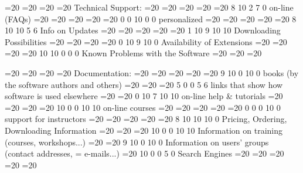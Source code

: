             =20
            =20
            =20
            =20
             Technical Support:
            =20
            =20
            =20
            =20
            =20
            8
             10
             2
             7
             0
             on-line (FAQs)
            =20
            =20
            =20
            =20
            =20
            0
             0
             10
             0
             0
             personalized
            =20
            =20
            =20
            =20
            =20
            8
             10
             10
             5
             6
             Info on Updates
            =20
            =20
            =20
            =20
            =20
            1
             10
             9
             10
             10
             Downloading Possibilities
            =20
            =20
            =20
            =20
            0
             10
             9
             10
             0
             Availability of Extensions
            =20
            =20
            =20
            =20
            10
             10
             0
             0
             0
             Known Problems with the Software
            =20
            =20
            =20

            =20
            =20
            =20
            =20
             Documentation:
            =20
            =20
            =20
            =20
            =20
            9
             10
             0
             10
             0
             books (by the software authors and others)
            =20
            =20
            =20
            5
             0
             0
             5
             6
             links that show how software is used elsewhere
            =20
            =20
            0
             10
             7
             10
             10
             on-line help & tutorials
            =20
            =20
            =20
            =20
            10
             0
             0
             10
             10
             on-line courses
            =20
            =20
            =20
            =20
            =20
            0
             0
             0
             10
             0
             support for instructors
            =20
            =20
            =20
            =20
            =20
            8
             10
             10
             10
             0
             Pricing, Ordering, Downloading Information
            =20
            =20
            =20
            10
             0
             0
             10
             10
             Information on training (courses, workshops...)
            =20
            =20
            9
             10
             0
             10
             0
             Information on users' groups (contact addresses, =
e-mails...)
            =20
            10
             0
             0
             5
             0
             Search Engines
            =20
            =20
            =20
            =20
            =20

